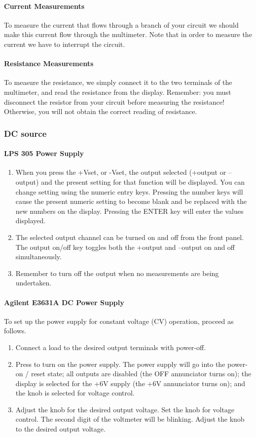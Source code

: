 \documentclass{article}
\begin{document}
\paragraph{Current Measurements}
To measure the current that flows through a branch of your circuit we should make this current flow through the multimeter. Note that in order to measure the current we have to interrupt the circuit.
\paragraph{Resistance Measurements}
To measure the resistance, we simply connect it to the two terminals of the multimeter, and read the resistance from the display. Remember: you must disconnect the resistor from your circuit before measuring the resistance! Otherwise, you will not obtain the correct reading of resistance.
\subsubsection{DC source}
\paragraph{LPS 305 Power Supply}
\begin{enumerate}[1.]
\item
When you press the +Vset, or -Vset, the output selected (+output or –output) and the present setting for that function will be displayed. You can change setting using the numeric entry keys. Pressing the number keys will cause the present numeric setting to become blank and be replaced with the new numbers on the display. Pressing the ENTER key will enter the values displayed.
\item
The selected output channel can be turned on and off from the front panel. The output on/off key toggles both the +output and –output on and off simultaneously.
\item
Remember to turn off the output when no measurements are being undertaken.
\end{enumerate}
\paragraph{Agilent E3631A DC Power Supply}
To set up the power supply for constant voltage (CV) operation, proceed as follows. 
\begin{enumerate}[1.]
\item
Connect a load to the desired output terminals with power-off.
\item
Press to turn on the power supply. The power supply will go into the power-on / reset state; all outputs are disabled (the OFF annunciator turns on); the display is selected for the +6V supply (the +6V annunciator turns on); and the knob is selected for voltage control.
\item
Adjust the knob for the desired output voltage. Set the knob for voltage control. The second digit of the voltmeter will be blinking. Adjust the knob to the desired output voltage.
\end{enumerate}
\end{document}
